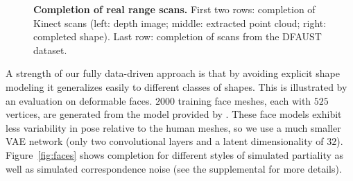 \documentclass[10pt,twocolumn,letterpaper]{article}
\begin{document}
\begin{figure}
\centering
{}
\newline
{}
\caption{\textbf{Completion of real range scans.} First two rows: completion of Kinect scans (left: depth image; middle: extracted point cloud; right: completed shape). Last row: completion of scans from the DFAUST dataset.
\vspace{-2mm}
} 
\label{fig:err_real_data}
\end{figure}%
A strength of our fully data-driven approach is that by avoiding explicit shape modeling it generalizes easily to different classes of shapes. This is illustrated by an evaluation on deformable faces. $2000$ training face meshes, each with $525$ vertices, are generated from the model provided by \cite{gerig2017morphable}. These face models exhibit less variability in pose relative to the human meshes, so we use a much smaller VAE network (only two convolutional layers and a latent dimensionality of $32$). Figure~\ref{fig:faces} shows completion for different styles of simulated partiality as well as simulated correspondence noise (see the supplemental for more details).
\end{document}
